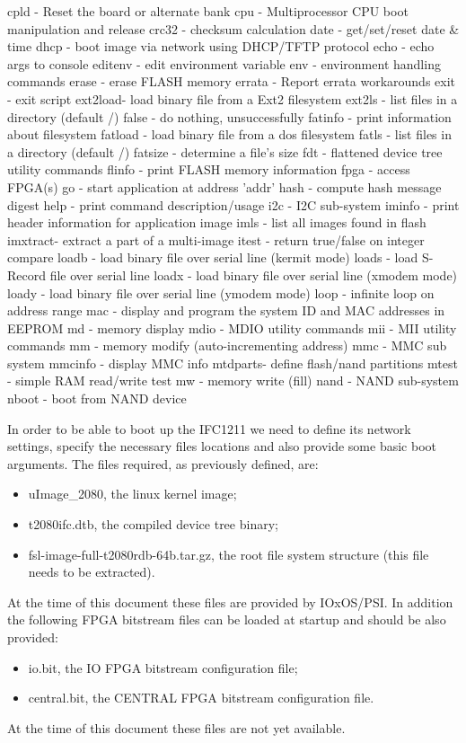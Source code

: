 \documentclass[11pt
  , a4paper
  , article
  , oneside
  , showtrims
]{memoir}
\begin{document}
cpld    - Reset the board or alternate bank
cpu     - Multiprocessor CPU boot manipulation and release
crc32   - checksum calculation
date    - get/set/reset date & time
dhcp    - boot image via network using DHCP/TFTP protocol
echo    - echo args to console
editenv - edit environment variable
env     - environment handling commands
erase   - erase FLASH memory
errata  - Report errata workarounds
exit    - exit script
ext2load- load binary file from a Ext2 filesystem
ext2ls  - list files in a directory (default /)
false   - do nothing, unsuccessfully
fatinfo - print information about filesystem
fatload - load binary file from a dos filesystem
fatls   - list files in a directory (default /)
fatsize - determine a file's size
fdt     - flattened device tree utility commands
flinfo  - print FLASH memory information
fpga    - access FPGA(s)
go      - start application at address 'addr'
hash    - compute hash message digest
help    - print command description/usage
i2c     - I2C sub-system
iminfo  - print header information for application image
imls    - list all images found in flash
imxtract- extract a part of a multi-image
itest   - return true/false on integer compare
loadb   - load binary file over serial line (kermit mode)
loads   - load S-Record file over serial line
loadx   - load binary file over serial line (xmodem mode)
loady   - load binary file over serial line (ymodem mode)
loop    - infinite loop on address range
mac     - display and program the system ID and MAC addresses in EEPROM
md      - memory display
mdio    - MDIO utility commands
mii     - MII utility commands
mm      - memory modify (auto-incrementing address)
mmc     - MMC sub system
mmcinfo - display MMC info
mtdparts- define flash/nand partitions
mtest   - simple RAM read/write test
mw      - memory write (fill)
nand    - NAND sub-system
nboot   - boot from NAND device
\fi

In order to be able to boot up the IFC1211 we need to define its network settings, specify the necessary files locations and also provide some basic boot arguments.
The files required, as previously defined, are:
\begin{itemize}
	\item uImage\_2080, the linux kernel image;
	\item t2080ifc.dtb, the compiled device tree binary;
	\item fsl-image-full-t2080rdb-64b.tar.gz, the root file system structure (this file needs to be extracted).
\end{itemize}
At the time of this document these files are provided by IOxOS/PSI.
In addition the following FPGA bitstream files can be loaded at startup and should be also provided:
\begin{itemize}
	\item io.bit, the IO FPGA bitstream configuration file;
	\item central.bit, the CENTRAL FPGA bitstream configuration file.
\end{itemize}
At the time of this document these files are not yet available.
\end{document}

